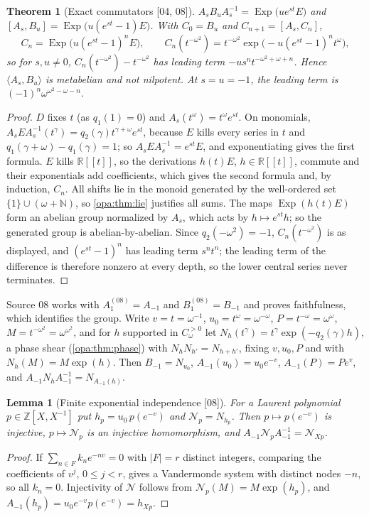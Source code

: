 \documentclass[11pt,oneside]{article}
\numberwithin{equation}{section}
\newtheorem{theorem}{Theorem}[section]
\newtheorem{lemma}[lemma]{Lemma}
\theoremstyle{definition}
\theoremstyle{remark}
\newcommand{\R}{\mathbb R}
\newcommand{\Z}{\mathbb Z}
\newcommand{\N}{\mathbb N}
\newcommand{\Exp}{\operatorname{Exp}}
\newcommand{\src}[1]{\textup{\textsf{\small[#1]}}}
\begin{document}
\begin{theorem}[Exact commutators \src{04, 08}]\label{opa:thm:commutator}
$A_sB_uA_s^{-1}=\Exp\bigl(ue^{st}E\bigr)$ and
$[A_s,B_u]=\Exp\bigl(u(e^{st}-1)E\bigr)$. With $C_0=B_u$ and $C_{n+1}=[A_s,C_n]$,
\[
 C_n=\Exp\bigl(u(e^{st}-1)^nE\bigr),\qquad
 C_n(t^{-\omega^2})=t^{-\omega^2}\exp\bigl(-u(e^{st}-1)^nt^\omega\bigr),
\]
so for $s,u\ne0$, $C_n(t^{-\omega^2})-t^{-\omega^2}$ has leading term
$-us^nt^{-\omega^2+\omega+n}$. Hence $\langle A_s,B_u\rangle$ is metabelian and not
nilpotent. At $s=u=-1$, the leading term is $(-1)^n\omega^{\omega^2-\omega-n}$.
\end{theorem}
\begin{proof}
$D$ fixes $t$ (as $q_1(1)=0$) and $A_s(t^\omega)=t^\omega e^{st}$. On monomials,
$A_sEA_s^{-1}(t^\gamma)=q_2(\gamma)t^{\gamma+\omega}e^{st}$, because $E$ kills every
series in $t$ and $q_1(\gamma+\omega)-q_1(\gamma)=1$; so $A_sEA_s^{-1}=e^{st}E$, and
exponentiating gives the first formula. $E$ kills $\R[[t]]$, so the derivations
$h(t)E$, $h\in\R[[t]]$, commute and their exponentials add coefficients, which
gives the second formula and, by induction, $C_n$. All shifts lie in the monoid
generated by the well-ordered set $\{1\}\cup(\omega+\N)$, so
\cref{opa:thm:lie} justifies all sums. The maps $\Exp(h(t)E)$ form an abelian group
normalized by $A_s$, which acts by $h\mapsto e^{st}h$; so the generated group is
abelian-by-abelian. Since $q_2(-\omega^2)=-1$, $C_n(t^{-\omega^2})$ is as displayed,
and $(e^{st}-1)^n$ has leading term $s^nt^n$; the leading term of the difference
is therefore nonzero at every depth, so the lower central series never
terminates.
\end{proof}

Source 08 works with $A_1^{(08)}=A_{-1}$ and $B_1^{(08)}=B_{-1}$ and proves
faithfulness, which identifies the group. Write $v=t=\omega^{-1}$,
$u_0=t^\omega=\omega^{-\omega}$, $P=t^{-\omega}=\omega^\omega$, $M=t^{-\omega^2}=\omega^{\omega^2}$,
and for $h$ supported in $C_\omega^{>0}$ let $N_h(t^\gamma)=t^\gamma\exp(-q_2(\gamma)h)$, a
phase shear (\cref{opa:thm:phase}) with $N_hN_{h'}=N_{h+h'}$, fixing $v,u_0,P$ and
with $N_h(M)=M\exp(h)$. Then $B_{-1}=N_{u_0}$, $A_{-1}(u_0)=u_0e^{-v}$,
$A_{-1}(P)=Pe^{v}$, and $A_{-1}N_hA_{-1}^{-1}=N_{A_{-1}(h)}$.

\begin{lemma}[Finite exponential independence \src{08}]\label{opa:lem:vandermonde}
For a Laurent polynomial $p\in\Z[X,X^{-1}]$ put $h_p=u_0\,p(e^{-v})$ and
$\mathcal N_p=N_{h_p}$. Then $p\mapsto p(e^{-v})$ is injective, $p\mapsto\mathcal N_p$
is an injective homomorphism, and $A_{-1}\mathcal N_pA_{-1}^{-1}=\mathcal N_{Xp}$.
\end{lemma}
\begin{proof}
If $\sum_{n\in F}k_ne^{-nv}=0$ with $|F|=r$ distinct integers, comparing the
coefficients of $v^j$, $0\le j<r$, gives a Vandermonde system with distinct nodes
$-n$, so all $k_n=0$. Injectivity of $\mathcal N$ follows from
$\mathcal N_p(M)=M\exp(h_p)$, and $A_{-1}(h_p)=u_0e^{-v}p(e^{-v})=h_{Xp}$.
\end{proof}
\end{document}
